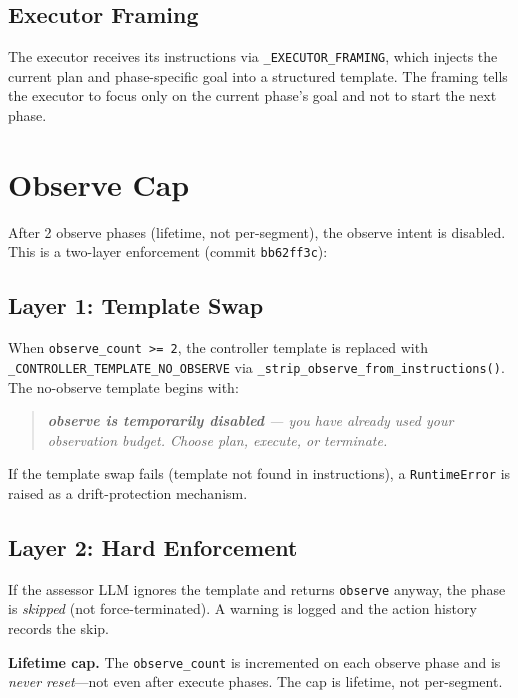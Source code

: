 \documentclass[11pt,letterpaper]{report}
\newcommand{\code}[1]{\texttt{#1}}
\begin{document}
\subsection{Executor Framing}

The executor receives its instructions via \code{\_EXECUTOR\_FRAMING},
which injects the current plan and phase-specific goal into a structured
template. The framing tells the executor to focus only on the current
phase's goal and not to start the next phase.


\section{Observe Cap}
\label{sec:observe-cap}

After 2 observe phases (lifetime, not per-segment), the observe intent
is disabled. This is a two-layer enforcement (commit \code{bb62ff3c}):

\subsection{Layer 1: Template Swap}

When \code{observe\_count >= 2}, the controller template is replaced
with \code{\_CONTROLLER\_TEMPLATE\_NO\_OBSERVE} via
\code{\_strip\_observe\_from\_instructions()}. The
no-observe template begins with:

\begin{quote}
\itshape
\textbf{observe is temporarily disabled} --- you have already used your
observation budget. Choose plan, execute, or terminate.
\end{quote}

If the template swap fails (template not found in instructions), a
\code{RuntimeError} is raised as a drift-protection mechanism.

\subsection{Layer 2: Hard Enforcement}

If the assessor LLM ignores the template and returns \code{observe}
anyway, the phase is \emph{skipped} (not force-terminated). A warning is
logged and the action history records the skip.

\noindent\textbf{Lifetime cap.}
The \code{observe\_count} is incremented on each observe phase
and is \emph{never reset}---not even after execute phases. The cap
is lifetime, not per-segment.
\end{document}
